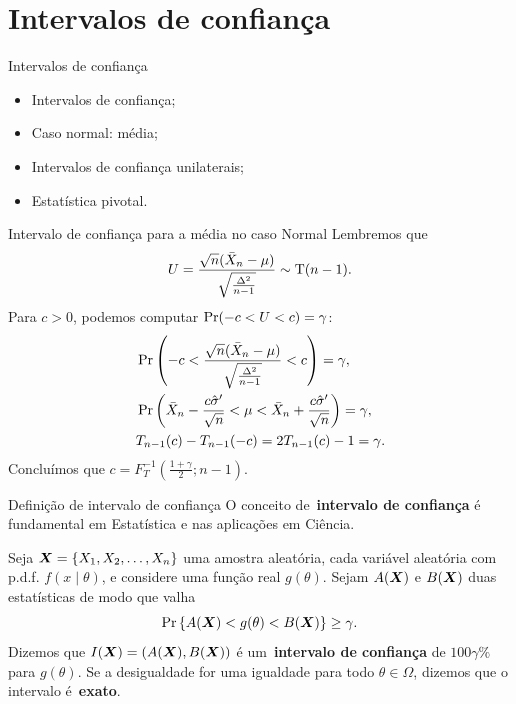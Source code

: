\section{Intervalos de confiança}
\begin{frame}{Intervalos de confiança}
 \begin{itemize}
  \item Intervalos de confiança;
  \item Caso normal: média;
  \item Intervalos de confiança unilaterais;
  \item Estatística pivotal.  
 \end{itemize}
\end{frame}

\begin{frame}{Intervalo de confiança para a média no caso Normal}
 Lembremos que 
 \begin{equation}
 U = \frac{\sqrt{n}(\bar{X}_n-\mu)}{\sqrt{\frac{\Delta^2}{n-1}}} \sim\operatorname{T}(n-1).
\end{equation}
Para $c>0$, podemos computar $\operatorname{Pr}(-c < U < c) = \gamma$:
\begin{align*}
 &\operatorname{Pr}\left(-c < \frac{\sqrt{n}(\bar{X}_n-\mu)}{\sqrt{\frac{\Delta^2}{n-1}}} < c\right) = \gamma,\\
 &\operatorname{Pr}\left( \bar{X}_n - \frac{c\hat{\sigma}^\prime}{\sqrt{n}} < \mu <  \bar{X}_n + \frac{c\hat{\sigma}^\prime}{\sqrt{n}}\right) = \gamma,\\
 &T_{n-1}(c) - T_{n-1}(-c) = 2T_{n-1}(c) - 1 = \gamma.
\end{align*}
Concluímos que $c = F_T^{-1}\left(\frac{1 + \gamma}{2}; n-1\right)$.
\end{frame}

\begin{frame}{Definição de intervalo de confiança}
 O conceito de~\textbf{intervalo de confiança} é fundamental em Estatística e nas aplicações em Ciência.
 \begin{defn}
  Seja $\boldsymbol{X} = \{ X_1, X_2, \ldots, X_n \}$ uma amostra aleatória, cada variável aleatória com p.d.f. $f(x\mid \theta)$, e considere uma função real $g(\theta)$.
  Sejam $A(\boldsymbol{X})$ e $B(\boldsymbol{X})$ duas estatísticas de modo que valha
  \begin{equation}
   \label{eq:confidence_interval}
   \operatorname{Pr}\left\{A(\boldsymbol{X}) < g(\theta) <  B(\boldsymbol{X})\right\} \geq \gamma.
  \end{equation}
Dizemos que $I(\boldsymbol{X}) = (A(\boldsymbol{X}), B(\boldsymbol{X}))$ é um~\textbf{intervalo de confiança} de $100\gamma\%$ para $g(\theta)$.
Se a desigualdade for uma igualdade para todo $\theta \in \Omega$, dizemos que o intervalo é~\textbf{exato}.
 \end{defn}
\end{frame}

